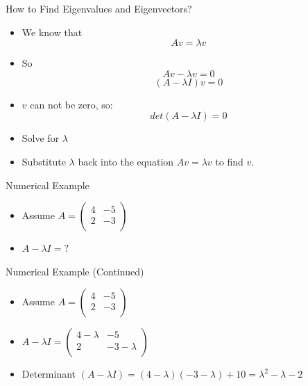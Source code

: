 \documentclass[serif, aspectratio=169]{beamer}
\begin{document}
\begin{frame}{How to Find Eigenvalues and Eigenvectors?}
    \begin{itemize}
        \item We know that
        $$Av = \lambda v$$
        \item So
        $$Av - \lambda v  = 0$$
        $$(A - \lambda I)v = 0$$
        \item $v$ can not be zero, so:
        $$det(A - \lambda I) = 0$$
        \item Solve for $\lambda$
        \item Substitute $\lambda$ back into the equation $Av = \lambda v$ to find $v$.
    \end{itemize}
\end{frame}

\begin{frame}{Numerical Example}
    \begin{itemize}
        \item Assume $A = \begin{pmatrix}  
4 & -5  \\
2 & -3 \\
\end{pmatrix} $
    \item $A - \lambda I =  ?$
    \end{itemize}
\end{frame}

\begin{frame}{Numerical Example (Continued)}
    \begin{itemize}
        \item Assume $A = \begin{pmatrix}  
4 & -5  \\
2 & -3 \\
\end{pmatrix} $
    \item $A - \lambda I =  \begin{pmatrix}  
4 - \lambda & -5  \\
2 & -3 - \lambda \\
\end{pmatrix}$
    \item Determinant $(A - \lambda I) = (4 - \lambda) (-3 - \lambda) + 10 = \lambda^2 - \lambda - 2$ 
    \end{itemize}
\end{frame}
\end{document}
